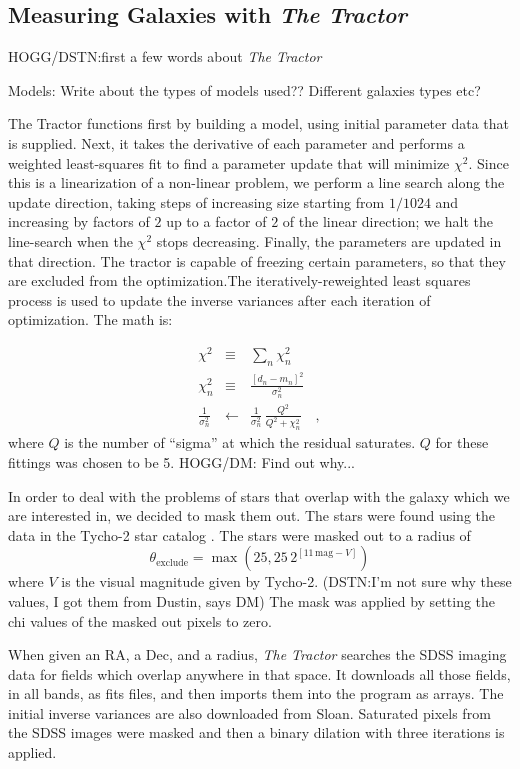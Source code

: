 \documentclass[12pt,preprint,pdftex]{aastex}
\newcommand{\project}[1]{\textsl{#1}}
\newcommand{\units}[1]{\mathrm{#1}}
\renewcommand{\mag}{\units{mag}}
\begin{document}
\subsection{Measuring Galaxies with \emph{The Tractor}} 

HOGG/DSTN:first a few words about \project{The Tractor}

Models: Write about the types of models used?? Different galaxies
types etc?  

The Tractor functions first by building a model, using
initial parameter data that is supplied. Next, it takes the derivative
of each parameter and performs a weighted least-squares fit to find a
parameter update that will minimize $\chi^2$.  Since this is a
linearization of a non-linear problem, we perform a line search along
the update direction, taking steps of increasing size starting from
$1/1024$ and increasing by factors of $2$ up to a factor of $2$ of the
linear direction; we halt the line-search when the $\chi^2$ stops
decreasing.  Finally, the parameters are updated in that direction. The
tractor is capable of freezing certain parameters, so that they are
excluded from the optimization.The iteratively-reweighted least
squares process is used to update the inverse variances after each
iteration of optimization. The math is:

\begin{eqnarray}
\chi^2 &\equiv& \sum_n \chi_n^2
\\
\chi_n^2 &\equiv& \frac{[d_n - m_n]^2}{\sigma_n^2}
\\
\frac{1}{\sigma_n^2} &\leftarrow& \frac{1}{\sigma_n^2}\,\frac{Q^2}{Q^2+\chi_n^2}
\quad ,
\end{eqnarray}
where $Q$ is the number of ``sigma'' at which the residual saturates. $Q$ for these fittings was chosen to be 5. HOGG/DM: Find out why...

In order to deal with the problems of stars that overlap with the
galaxy which we are interested in, we decided to mask them out. The
stars were found using the data in the Tycho-2 star catalog \citep{tycho2}.
The stars were masked out to a
radius of
\begin{equation}
\theta_{\mathrm{exclude}} = \max(25, 25\,2^{[11\,\mag-V]})
\end{equation}
where $V$ is the visual magnitude given by Tycho-2.
(DSTN:I'm not sure why these values, I got them from Dustin, says DM) The mask was applied by setting the chi values of the masked out pixels to zero.

When given an RA, a Dec, and a radius, \emph{The Tractor} searches the SDSS imaging
data for fields which overlap anywhere in that space. It downloads all
those fields, in all bands, as fits files, and then imports them into
the program as arrays. The initial inverse variances are also
downloaded from Sloan.  Saturated pixels from the SDSS images were
masked and then a binary dilation with three iterations is
applied.
\end{document}
